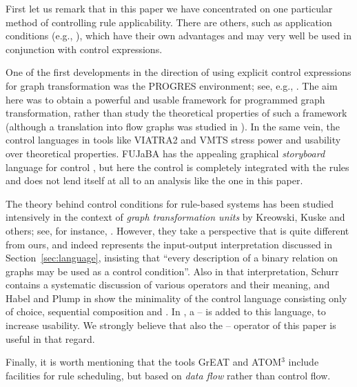First let us remark that in this paper we have concentrated on one particular
method of controlling rule applicability. There are others, such as application
conditions (e.g., \cite{HabelHecTae1996,HabelPen2005}), which have their own
advantages and may very well be used in conjunction with control expressions.

One of the first developments in the direction of using explicit control
expressions for graph transformation was the PROGRES environment; see, e.g.,
\cite{Schurr1990,PROGRES}. The aim here was to obtain a powerful and usable
framework for programmed graph transformation, rather than study the
theoretical properties of such a framework (although a translation into flow
graphs was studied in \cite{ZundorfSch1992}). In the same vein, the control
languages in tools like VIATRA2 \cite{VarroBal2007} and VMTS
\cite{Lengyel+2006} stress power and usability over theoretical properties.
FUJaBA has the appealing graphical \emph{storyboard} language for control
\cite{Fischer+2000}, but here the control is completely integrated with
the rules and does not lend itself at all to an analysis like the one in this
paper.

The theory behind control conditions for rule-based systems has been studied
intensively in the context of \emph{graph transformation units} by Kreowski,
Kuske and others; see, for instance,
\cite{KreowskiKus1996,KreowskiKus1999,Kuske2000}. However, they take a
perspective that is quite different from ours, and indeed represents the
input-output interpretation discussed in Section~\ref{sec:language}, insisting
that ``every description of a binary relation on graphs may be used as a
control condition''.  Also in that interpretation, Schurr \cite{Schurr1997}
contains a systematic discussion of various operators and their meaning, and
Habel and Plump in \cite{HabelPlump01} show the minimality of the control
language consisting only of choice, sequential composition and \alapK. In
\cite{PlumpSteinert04}, a \whileK--\doK{} is added to this language, to
increase usability. We strongly believe that also the \tryK--\elseK{} operator
of this paper is useful in that regard.%

Finally, it is worth mentioning that the tools GrEAT \cite{Vizhanyo+2006} and
ATOM${}^3$ \cite{SyrianiVan2007} include
facilities for rule scheduling, but based on \emph{data flow} rather than
control flow.

